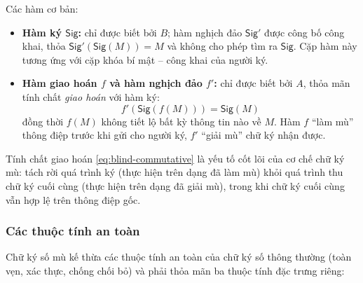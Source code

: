 Các hàm cơ bản:
\begin{itemize}
    \item \textbf{Hàm ký $\textsf{Sig}$:} chỉ được biết bởi $B$; hàm nghịch đảo $\textsf{Sig}'$ được công bố công khai, thỏa $\textsf{Sig}'(\textsf{Sig}(M)) = M$ và không cho phép tìm ra $\textsf{Sig}$. Cặp hàm này tương ứng với cặp khóa bí mật -- công khai của người ký.
    \item \textbf{Hàm giao hoán $f$ và hàm nghịch đảo $f'$:} chỉ được biết bởi $A$, thỏa mãn tính chất \textit{giao hoán} với hàm ký:
    \begin{equation}
        f'(\textsf{Sig}(f(M))) = \textsf{Sig}(M)
        \label{eq:blind-commutative}
    \end{equation}
    đồng thời $f(M)$ không tiết lộ bất kỳ thông tin nào về $M$. Hàm $f$ ``làm mù'' thông điệp trước khi gửi cho người ký, $f'$ ``giải mù'' chữ ký nhận được.
\end{itemize}

Tính chất giao hoán \eqref{eq:blind-commutative} là yếu tố cốt lõi của cơ chế chữ ký mù: tách rời quá trình ký (thực hiện trên dạng đã làm mù) khỏi quá trình thu chữ ký cuối cùng (thực hiện trên dạng đã giải mù), trong khi chữ ký cuối cùng vẫn hợp lệ trên thông điệp gốc.

\subsubsection{Các thuộc tính an toàn}
\label{sec:thuoc-tinh-an-toan-chu-ky-mu}

Chữ ký số mù kế thừa các thuộc tính an toàn của chữ ký số thông thường (toàn vẹn, xác thực, chống chối bỏ) và phải thỏa mãn ba thuộc tính đặc trưng riêng:

